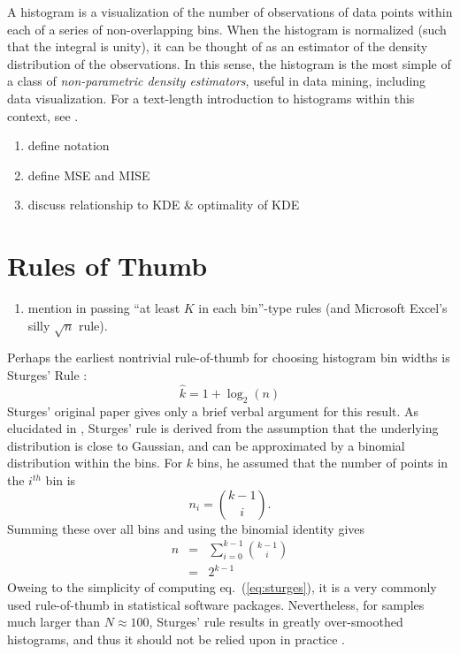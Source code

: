 \documentclass[12pt]{article}
\newcommand{\eqn}[1]{eq.~(\ref{eq:#1})}
\begin{document}
A histogram is a visualization of the number of observations of data points
within each of a series of non-overlapping bins.  When the histogram is
normalized (such that the integral is unity), it can be thought of as an
estimator of the density distribution of the observations.
In this sense, the histogram is the most simple of a class of
{\it non-parametric density estimators}, useful in data mining, including
data visualization.  For a text-length introduction to histograms within
this context, see \citet{Scott1992}.

\begin{enumerate}
  \item define notation
  \item define MSE and MISE
  \item discuss relationship to KDE \& optimality of KDE
\end{enumerate}


\section{Rules of Thumb}
\label{sec:rules_of_thumb}
\begin{enumerate}
  \item mention in passing ``at least $K$ in each bin''-type rules
    (and Microsoft Excel's silly $\sqrt{n}$ rule).
\end{enumerate}

Perhaps the earliest nontrivial rule-of-thumb for choosing histogram
bin widths is Sturges' Rule \citep{Sturges1926}:
\begin{equation}
  \label{eqn:sturges}
  \hat{k} = 1 + \log_2(n)
\end{equation}
Sturges' original paper gives only a brief verbal argument for this result.
As elucidated in \citet{Scott2009}, Sturges' rule is derived from the
assumption that the underlying distribution is close to Gaussian, and
can be approximated by a binomial distribution within the bins.  For $k$ bins,
he assumed that the number of points in the $i^{th}$ bin is 
\begin{equation}
  n_i = \binom{k - 1}{i}.
\end{equation}
Summing these over all bins and using the binomial identity gives
\begin{eqnarray}
  n &=& \sum_{i=0}^{k-1} \binom{k-1}{i}\\
    &=& 2^{k - 1}
\end{eqnarray}
Oweing to the simplicity of computing \eqn{sturges}, it is a very commonly
used rule-of-thumb in statistical software packages.  Nevertheless, for
samples much larger than $N \approx 100$, Sturges' rule results in greatly
over-smoothed histograms, and thus it should not be relied upon in practice
\citep{Scott2009}.
\end{document}
